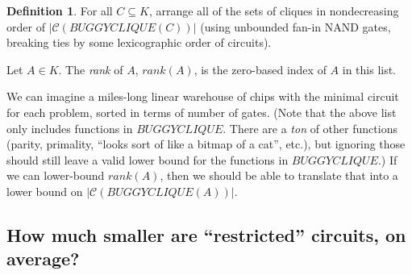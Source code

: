 \documentclass[12pt]{article}
\theoremstyle{definition}
\newtheorem{defn}{Definition}[section]
\newcommand{\bigC}[0]{\mathcal{C}}
\begin{document}
\begin{defn}
\label{Rank}
For all $C \subseteq K$,
arrange all of the sets of cliques in nondecreasing order
of $|\bigC(BUGGYCLIQUE(C))|$ (using unbounded fan-in NAND gates,
breaking ties by some lexicographic order of circuits).

Let $A \in K$. The {\em rank} of $A$, $rank(A)$, is the zero-based
index of $A$ in this list.
\end{defn}

We can imagine a miles-long linear warehouse of chips with the minimal
circuit for each problem, sorted in terms of number of gates.
(Note that the above list only includes functions in $BUGGYCLIQUE$.
There are a {\em ton} of other functions (parity, primality, ``looks
sort of like a bitmap of a cat'', etc.), but ignoring
those should still leave a valid lower bound for the functions in $BUGGYCLIQUE$.)
If we can lower-bound $rank(A)$, then we should be able to translate
that into a
lower bound on $|\bigC(BUGGYCLIQUE(A))|$.

\subsection{How much smaller are ``restricted'' circuits, on average?}
\end{document}
